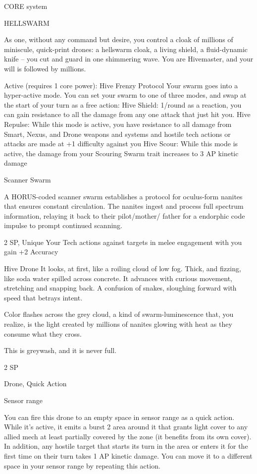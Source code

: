                                                CORE system




                                                    HELLSWARM

 As one, without any command but desire, you control a cloak of millions of miniscule, quick-print
 drones: a hellswarm cloak, a living shield, a fluid-dynamic knife -- you cut and guard in one shimmering
 wave. You are Hivemaster, and your will is followed by millions.

 Active (requires 1 core power): Hive Frenzy
 Protocol
 Your swarm goes into a hyper-active mode. You can set your swarm to one of three modes, and swap
 at the start of your turn as a free action:
 Hive Shield: 1/round as a reaction, you can gain resistance to all the damage from any one attack that
 just hit you.
 Hive Repulse: While this mode is active, you have resistance to all damage from Smart, Nexus, and
  Drone weapons and systems and hostile tech actions or attacks are made at +1 difficulty against you
 Hive Scour: While this mode is active, the damage from your Scouring Swarm trait increases to 3 AP
  kinetic damage

Scanner Swarm

A HORUS-coded scanner swarm establishes a protocol for oculus-form nanites that ensures constant
circulation. The nanites ingest and process full spectrum information, relaying it back to their pilot/mother/
father for a endorphic code impulse to prompt continued scanning.

2 SP, Unique
Your Tech actions against targets in melee engagement with you gain +2 Accuracy


Hive Drone
It looks, at first, like a roiling cloud of low fog. Thick, and fizzing, like soda water spilled across concrete. It
advances with curious movement, stretching and snapping back. A confusion of snakes, sloughing forward
with speed that betrays intent.

Color flashes across the grey cloud, a kind of swarm-luminescence that, you realize, is the light created by
millions of nanites glowing with heat as they consume what they cross.

This is greywash, and it is never full.

2 SP

Drone, Quick Action


Sensor range

You can fire this drone to an empty space in sensor range as a quick action. While it’s active, it
emits a burst 2 area around it that grants light cover to any allied mech at least partially covered
by the zone (it benefits from its own cover). In addition, any hostile target that starts its turn in the
area or enters it for the first time on their turn takes 1 AP kinetic damage. You can move it to a
different space in your sensor range by repeating this action.



